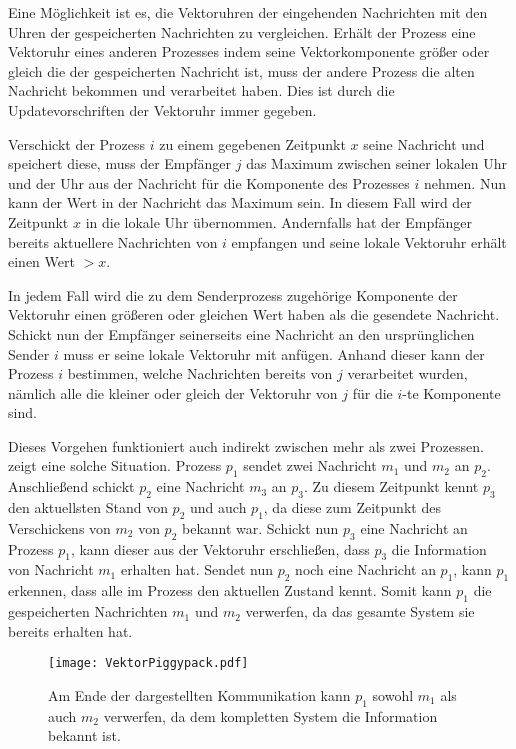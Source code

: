 Eine Möglichkeit ist es, die Vektoruhren der eingehenden Nachrichten mit den Uhren der gespeicherten Nachrichten zu vergleichen.
Erhält der Prozess eine Vektoruhr eines anderen Prozesses indem seine Vektorkomponente größer oder gleich die der gespeicherten Nachricht ist, muss der andere Prozess die alten Nachricht bekommen und verarbeitet haben.
Dies ist durch die Updatevorschriften der Vektoruhr immer gegeben.

Verschickt der Prozess $i$ zu einem gegebenen Zeitpunkt $x$ seine Nachricht und speichert diese, muss der Empfänger $j$ das Maximum zwischen seiner lokalen Uhr und der Uhr aus der Nachricht für die Komponente des Prozesses $i$ nehmen.
Nun kann der Wert in der Nachricht das Maximum sein.
In diesem Fall wird der Zeitpunkt $x$ in die lokale Uhr übernommen.
Andernfalls hat der Empfänger bereits aktuellere Nachrichten von $i$ empfangen und seine lokale Vektoruhr erhält einen Wert $>x$.

In jedem Fall wird die zu dem Senderprozess zugehörige Komponente der Vektoruhr einen größeren oder gleichen Wert haben als die gesendete Nachricht.
Schickt nun der Empfänger seinerseits eine Nachricht an den ursprünglichen Sender $i$ muss er seine lokale Vektoruhr mit anfügen.
Anhand dieser kann der Prozess $i$ bestimmen, welche Nachrichten bereits von $j$ verarbeitet wurden, nämlich alle die kleiner oder gleich der Vektoruhr von $j$ für die $i$-te Komponente sind.

Dieses Vorgehen funktioniert auch indirekt zwischen mehr als zwei Prozessen.
 zeigt eine solche Situation.
Prozess $p_1$ sendet zwei Nachricht $m_1$ und $m_2$ an $p_2$.
Anschließend schickt $p_2$ eine Nachricht $m_3$ an $p_3$.
Zu diesem Zeitpunkt kennt $p_3$ den aktuellsten Stand von $p_2$ und auch $p_1$, da diese zum Zeitpunkt des Verschickens von $m_2$ von $p_2$ bekannt war.
Schickt nun $p_3$ eine Nachricht an Prozess $p_1$, kann dieser aus der Vektoruhr erschließen, dass $p_3$ die Information von Nachricht $m_1$ erhalten hat.
Sendet nun $p_2$ noch eine Nachricht an $p_1$, kann $p_1$ erkennen, dass alle im Prozess den aktuellen Zustand kennt.
Somit kann $p_1$ die gespeicherten Nachrichten $m_1$ und $m_2$ verwerfen, da das gesamte System sie bereits erhalten hat.

\begin{figure}[ht]
    \centering
    \texttt{[image: VektorPiggypack.pdf]}
    \caption[Löschen alter Nachrichten]{Am Ende der dargestellten Kommunikation kann  $p_1$ sowohl $m_1$ als auch $m_2$ verwerfen, da dem kompletten System die Information bekannt ist.}
    \label{fig:vectorPiggyback}
\end{figure} 

